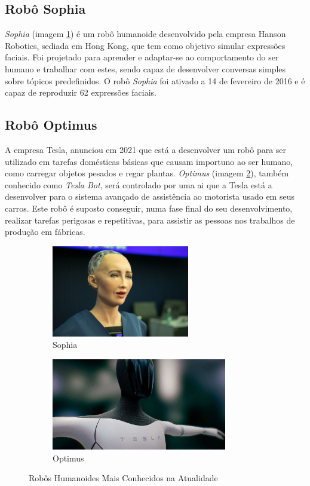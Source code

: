 \documentclass{report}
\begin{document}
\newpage

\subsection{Robô Sophia}

\textit{Sophia} (imagem \ref{sophia}) é um robô humanoide desenvolvido pela empresa Hanson Robotics, sediada em Hong Kong, que tem como objetivo simular expressões faciais. Foi projetado para aprender e adaptar-se ao comportamento do ser humano e trabalhar com estes, sendo capaz de desenvolver conversas simples sobre tópicos predefinidos. O robô \textit{Sophia} foi ativado a 14 de fevereiro de 2016 e é capaz de reproduzir 62 expressões faciais.

\subsection{Robô Optimus}

A empresa Tesla, anunciou em 2021 que está a desenvolver um robô para ser utilizado em tarefas domésticas básicas que causam importuno ao ser humano, como carregar objetos pesados e regar plantas. \textit{Optimus} (imagem \ref{optimus}), também conhecido como \textit{Tesla Bot}, será controlado por uma \ac{ai} que a Tesla está a desenvolver para o sistema avançado de assistência ao motorista usado em seus carros. Este robô é suposto conseguir, numa fase final do seu desenvolvimento, realizar tarefas perigosas e repetitivas, para assistir as pessoas nos trabalhos de produção em fábricas.

\begin{figure}[h]

\begin{subfigure}{0.5\textwidth}
\includegraphics[width=0.9\linewidth, height=4cm]{Sophia.png} 
\caption{Sophia}
\label{sophia}
\end{subfigure}
\begin{subfigure}{0.5\textwidth}
\includegraphics[width=0.9\linewidth, height=4cm]{tesla.png}
\caption{Optimus}
\label{optimus}
\end{subfigure}

\caption{Robôs Humanoides Mais Conhecidos na Atualidade}
\label{Robos}
\end{figure}
\end{document}
